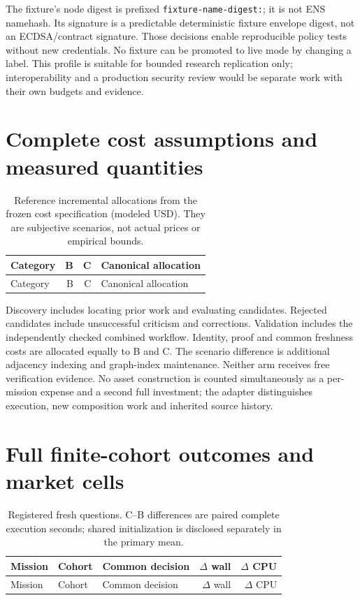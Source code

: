\documentclass[11pt,a4paper]{article}
\newcommand{\code}[1]{\nolinkurl{#1}}
\begin{document}
The fixture's node digest is prefixed \code{fixture-name-digest:}; it is not ENS namehash. Its signature is a predictable deterministic fixture envelope digest, not an ECDSA/contract signature. Those decisions enable reproducible policy tests without new credentials. No fixture can be promoted to live mode by changing a label. This profile is suitable for bounded research replication only; interoperability and a production security review would be separate work with their own budgets and evidence.

\section{Complete cost assumptions and measured quantities}
\label{app:costs}
\begin{longtable}{L{58mm}rrL{59mm}}
\caption{Reference incremental allocations from the frozen cost specification (modeled USD). They are subjective scenarios, not actual prices or empirical bounds.}\\
\toprule Category & B & C & Canonical allocation \\
\midrule\endfirsthead
\toprule Category & B & C & Canonical allocation \\
\midrule\endhead

\end{longtable}

Discovery includes locating prior work and evaluating candidates. Rejected candidates include unsuccessful criticism and corrections. Validation includes the independently checked combined workflow. Identity, proof and common freshness costs are allocated equally to B and C. The scenario difference is additional adjacency indexing and graph-index maintenance. Neither arm receives free verification evidence. No asset construction is counted simultaneously as a per-mission expense and a second full investment; the adapter distinguishes execution, new composition work and inherited source history.



\section{Full finite-cohort outcomes and market cells}
\label{app:fullresults}
\begin{longtable}{L{58mm}L{21mm}L{26mm}rr}
\caption{Registered fresh questions. C--B differences are paired complete execution seconds; shared initialization is disclosed separately in the primary mean.}\\
\toprule Mission & Cohort & Common decision & $\Delta$ wall & $\Delta$ CPU \\
\midrule\endfirsthead
\toprule Mission & Cohort & Common decision & $\Delta$ wall & $\Delta$ CPU \\
\midrule\endhead

\end{longtable}
\end{document}

